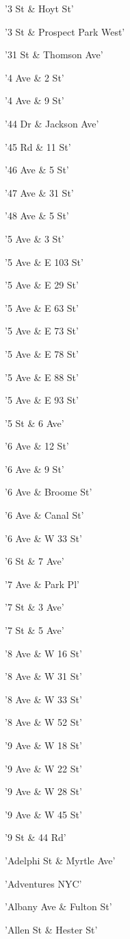 \documentclass[11pt]{article}
\begin{document}
\begin{enumerate*}
\item '3 St \& Hoyt St'
\item '3 St \& Prospect Park West'
\item '31 St \& Thomson Ave'
\item '4 Ave \& 2 St'
\item '4 Ave \& 9 St'
\item '44 Dr \& Jackson Ave'
\item '45 Rd \& 11 St'
\item '46 Ave \& 5 St'
\item '47 Ave \& 31 St'
\item '48 Ave \& 5 St'
\item '5 Ave \& 3 St'
\item '5 Ave \& E 103 St'
\item '5 Ave \& E 29 St'
\item '5 Ave \& E 63 St'
\item '5 Ave \& E 73 St'
\item '5 Ave \& E 78 St'
\item '5 Ave \& E 88 St'
\item '5 Ave \& E 93 St'
\item '5 St \& 6 Ave'
\item '6 Ave \& 12 St'
\item '6 Ave \& 9 St'
\item '6 Ave \& Broome St'
\item '6 Ave \& Canal St'
\item '6 Ave \& W 33 St'
\item '6 St \& 7 Ave'
\item '7 Ave \& Park Pl'
\item '7 St \& 3 Ave'
\item '7 St \& 5 Ave'
\item '8 Ave \& W 16 St'
\item '8 Ave \& W 31 St'
\item '8 Ave \& W 33 St'
\item '8 Ave \& W 52 St'
\item '9 Ave \& W 18 St'
\item '9 Ave \& W 22 St'
\item '9 Ave \& W 28 St'
\item '9 Ave \& W 45 St'
\item '9 St \& 44 Rd'
\item 'Adelphi St \& Myrtle Ave'
\item 'Adventures NYC'
\item 'Albany Ave \& Fulton St'
\item 'Allen St \& Hester St'

\end{enumerate*}
\end{document}
